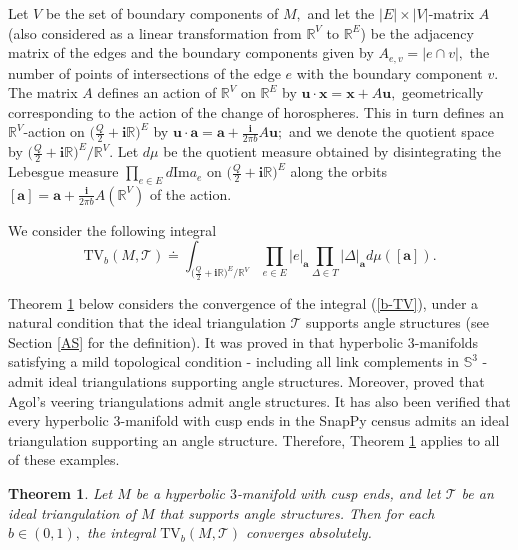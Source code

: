 \documentclass[11pt]{article}
\newtheorem{theorem}{Theorem}[section]
\theoremstyle{remark}
\theoremstyle{remark}
\numberwithin{equation}{section}
\begin{document}
Let $V$ be the set of boundary components of $M,$ and let the $|E|\times |V|$-matrix $A$ (also considered as a linear transformation from $\mathbb R^V$ to $\mathbb R^E$) be the adjacency matrix of the edges and the boundary components given by $A_{e,v}=|e\cap v|,$ the number of points of intersections of the edge $e$ with the boundary component $v.$ The matrix $A$ defines an action of $\mathbb R^V$ on $\mathbb R^E$ by 
$\boldsymbol u\cdot\boldsymbol x=\boldsymbol x + A\boldsymbol u,$ geometrically corresponding to the action of the change of horospheres. This in turn defines an $\mathbb R^V$-action on $\big(\frac{Q}{2}+\mathbf i \mathbb R\big)^E$ by $\boldsymbol u\cdot \boldsymbol a = \boldsymbol a + \frac{\mathbf i}{2\pi b} A \boldsymbol u;$ and we denote the quotient space by  $\big(\frac{Q}{2}+\mathbf i \mathbb R\big)^E/\mathbb R^V.$ Let $d
\mu$ be the quotient measure obtained by disintegrating the Lebesgue measure $\prod_{e\in E} d\mathrm{Im}a_e$ on $\big(\frac{Q}{2}+\mathbf i\mathbb R\big)^ E$ along the orbits $[\boldsymbol a]= \boldsymbol a + \frac{\mathbf i}{2\pi b} A(\mathbb R^V)$ of the action. 


We consider the following integral 
\begin{equation}\label{b-TV}
    \mathrm{TV}_b(M,\mathcal T)\doteq \int_{\big(\frac{Q}{2}+\mathbf i\mathbb R\big)^ E/\mathbb R^V} \prod_{e\in E} |e|_{\boldsymbol{a}}\prod_{\Delta\in T}|\Delta|_{\boldsymbol a}d\mu([\boldsymbol a]).
\end{equation}


Theorem \ref{converge} below considers the convergence of the integral (\ref{b-TV}), under a natural condition that the ideal triangulation $\mathcal T$ supports angle structures (see Section \ref{AS} for the definition).  It was proved in \cite{HRS} that hyperbolic $3$-manifolds satisfying a mild topological condition - including all link complements in $\mathbb S^3$ - admit ideal triangulations supporting angle structures. Moreover, \cite{HRST} proved that Agol's veering triangulations admit angle structures. It has also been verified that every hyperbolic $3$-manifold with cusp ends in the SnapPy census admits an ideal triangulation supporting an angle structure. Therefore, Theorem \ref{converge} applies to all of these examples. 

\begin{theorem}\label{converge}
Let $M$ be a hyperbolic $3$-manifold with cusp ends, and let $\mathcal T$ be an ideal triangulation of $M$ that supports angle structures. Then for each $b\in (0,1),$ the integral $\mathrm{TV}_b(M,\mathcal T)$ converges absolutely.
\end{theorem}
\end{document}
